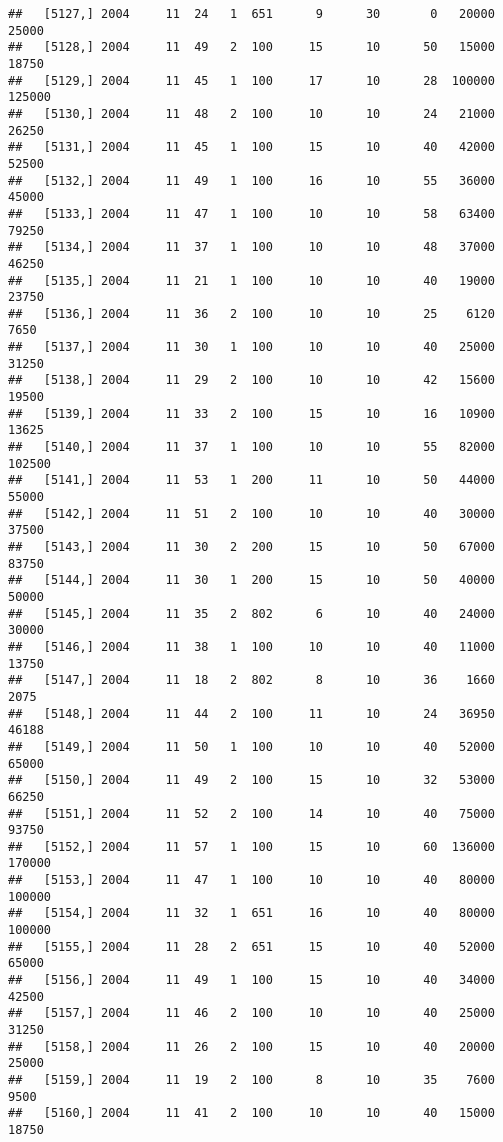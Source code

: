 \documentclass{article}\usepackage[]{graphicx}\usepackage[]{color}
\makeatletter
\newenvironment{kframe}{%
 \def\at@end@of@kframe{}%
 \ifinner\ifhmode%
  \def\at@end@of@kframe{\end{minipage}}%
  \begin{minipage}{\columnwidth}%
 \fi\fi%
 \def\FrameCommand##1{\hskip\@totalleftmargin \hskip-\fboxsep
 \colorbox{shadecolor}{##1}\hskip-\fboxsep
     \hskip-\linewidth \hskip-\@totalleftmargin \hskip\columnwidth}%
 \MakeFramed {\advance\hsize-\width
   \@totalleftmargin\z@ \linewidth\hsize
   \@setminipage}}%
 {\par\unskip\endMakeFramed%
 \at@end@of@kframe}
\newenvironment{knitrout}{}{} %
\makeatother
\begin{document}
\begin{knitrout}
\begin{kframe}
\begin{verbatim}
##   [5127,] 2004     11  24   1  651      9      30       0   20000   25000
##   [5128,] 2004     11  49   2  100     15      10      50   15000   18750
##   [5129,] 2004     11  45   1  100     17      10      28  100000  125000
##   [5130,] 2004     11  48   2  100     10      10      24   21000   26250
##   [5131,] 2004     11  45   1  100     15      10      40   42000   52500
##   [5132,] 2004     11  49   1  100     16      10      55   36000   45000
##   [5133,] 2004     11  47   1  100     10      10      58   63400   79250
##   [5134,] 2004     11  37   1  100     10      10      48   37000   46250
##   [5135,] 2004     11  21   1  100     10      10      40   19000   23750
##   [5136,] 2004     11  36   2  100     10      10      25    6120    7650
##   [5137,] 2004     11  30   1  100     10      10      40   25000   31250
##   [5138,] 2004     11  29   2  100     10      10      42   15600   19500
##   [5139,] 2004     11  33   2  100     15      10      16   10900   13625
##   [5140,] 2004     11  37   1  100     10      10      55   82000  102500
##   [5141,] 2004     11  53   1  200     11      10      50   44000   55000
##   [5142,] 2004     11  51   2  100     10      10      40   30000   37500
##   [5143,] 2004     11  30   2  200     15      10      50   67000   83750
##   [5144,] 2004     11  30   1  200     15      10      50   40000   50000
##   [5145,] 2004     11  35   2  802      6      10      40   24000   30000
##   [5146,] 2004     11  38   1  100     10      10      40   11000   13750
##   [5147,] 2004     11  18   2  802      8      10      36    1660    2075
##   [5148,] 2004     11  44   2  100     11      10      24   36950   46188
##   [5149,] 2004     11  50   1  100     10      10      40   52000   65000
##   [5150,] 2004     11  49   2  100     15      10      32   53000   66250
##   [5151,] 2004     11  52   2  100     14      10      40   75000   93750
##   [5152,] 2004     11  57   1  100     15      10      60  136000  170000
##   [5153,] 2004     11  47   1  100     10      10      40   80000  100000
##   [5154,] 2004     11  32   1  651     16      10      40   80000  100000
##   [5155,] 2004     11  28   2  651     15      10      40   52000   65000
##   [5156,] 2004     11  49   1  100     15      10      40   34000   42500
##   [5157,] 2004     11  46   2  100     10      10      40   25000   31250
##   [5158,] 2004     11  26   2  100     15      10      40   20000   25000
##   [5159,] 2004     11  19   2  100      8      10      35    7600    9500
##   [5160,] 2004     11  41   2  100     10      10      40   15000   18750

\end{verbatim}
\end{kframe}
\end{knitrout}
\end{document}
